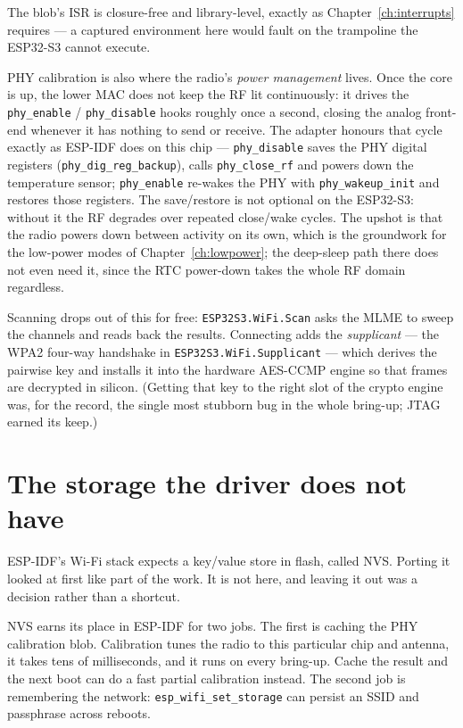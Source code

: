 The blob's ISR is closure-free and library-level, exactly as
Chapter~\ref{ch:interrupts} requires --- a captured environment here would fault
on the trampoline the ESP32-S3 cannot execute.

PHY calibration is also where the radio's \emph{power management} lives. Once the
core is up, the lower MAC does not keep the RF lit continuously: it drives the
\texttt{phy\_enable} / \texttt{phy\_disable} hooks roughly once a second, closing
the analog front-end whenever it has nothing to send or receive. The adapter
honours that cycle exactly as ESP-IDF does on this chip --- \texttt{phy\_disable}
saves the PHY digital registers (\texttt{phy\_dig\_reg\_backup}), calls
\texttt{phy\_close\_rf} and powers down the temperature sensor; \texttt{phy\_enable}
re-wakes the PHY with \texttt{phy\_wakeup\_init} and restores those registers. The
save/restore is not optional on the ESP32-S3: without it the RF degrades over
repeated close/wake cycles. The upshot is that the radio powers down between
activity on its own, which is the groundwork for the low-power modes of
Chapter~\ref{ch:lowpower}; the deep-sleep path there does not even need it, since
the RTC power-down takes the whole RF domain regardless.

Scanning drops out of this for free: \texttt{ESP32S3.WiFi.Scan} asks the MLME to
sweep the channels and reads back the results. Connecting adds the
\emph{supplicant} --- the WPA2 four-way handshake in \texttt{ESP32S3.WiFi.Supplicant}
--- which derives the pairwise key and installs it into the hardware AES-CCMP
engine so that frames are decrypted in silicon. (Getting that key to the right
slot of the crypto engine was, for the record, the single most stubborn bug in
the whole bring-up; JTAG earned its keep.)

\section{The storage the driver does not have}
\label{ch:wifi:nvs}

ESP-IDF's Wi-Fi stack expects a key/value store in flash, called NVS. Porting it
looked at first like part of the work. It is not here, and leaving it out was a
decision rather than a shortcut.

NVS earns its place in ESP-IDF for two jobs. The first is caching the PHY
calibration blob. Calibration tunes the radio to this particular chip and
antenna, it takes tens of milliseconds, and it runs on every bring-up. Cache the
result and the next boot can do a fast partial calibration instead. The second
job is remembering the network: \texttt{esp\_wifi\_set\_storage} can persist an
SSID and passphrase across reboots.

